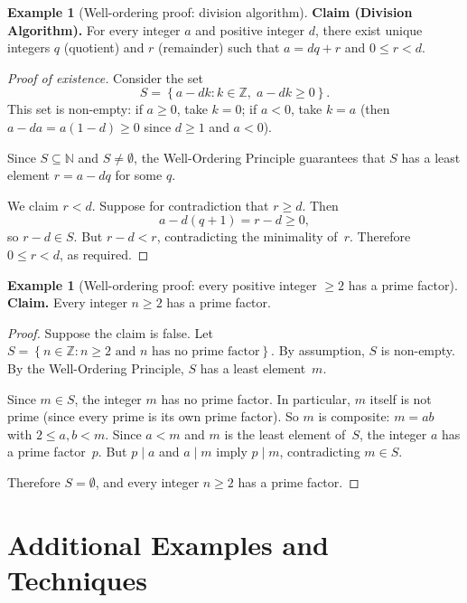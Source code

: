 \documentclass[12pt,a4paper,openany]{book}
\theoremstyle{definition}
\newtheorem{example}[definition]{Example}
\theoremstyle{plain}
\theoremstyle{remark}
\newcommand{\N}{\mathbb{N}}
\newcommand{\Z}{\mathbb{Z}}
\newcommand{\set}[1]{\left\{#1\right\}}
\begin{document}
\begin{example}[Well-ordering proof: division algorithm]
\label{ex:well-ordering-division}
\textbf{Claim (Division Algorithm).}
For every integer $a$ and positive integer $d$, there exist unique integers $q$
(quotient) and $r$ (remainder) such that $a = dq + r$ and $0 \leq r < d$.

\begin{proof}[Proof of existence]
Consider the set
\[
  S = \set{a - dk : k \in \Z,\; a - dk \geq 0}.
\]
This set is non-empty: if $a \geq 0$, take $k = 0$; if $a < 0$, take $k = a$
(then $a - da = a(1 - d) \geq 0$ since $d \geq 1$ and $a < 0$).

Since $S \subseteq \N$ and $S \neq \emptyset$, the Well-Ordering Principle
guarantees that $S$ has a least element $r = a - dq$ for some $q$.

We claim $r < d$. Suppose for contradiction that $r \geq d$. Then
\[
  a - d(q + 1) = r - d \geq 0,
\]
so $r - d \in S$. But $r - d < r$, contradicting the minimality of~$r$.
Therefore $0 \leq r < d$, as required.
\end{proof}
\end{example}

\begin{example}[Well-ordering proof: every positive integer $\geq 2$ has a prime factor]
\label{ex:well-ordering-prime-factor}
\textbf{Claim.} Every integer $n \geq 2$ has a prime factor.

\begin{proof}
Suppose the claim is false. Let $S = \set{n \in \Z : n \geq 2 \text{ and $n$ has no prime factor}}$.
By assumption, $S$ is non-empty. By the Well-Ordering Principle, $S$ has a least
element~$m$.

Since $m \in S$, the integer $m$ has no prime factor. In particular, $m$ itself is
not prime (since every prime is its own prime factor). So $m$ is composite:
$m = ab$ with $2 \leq a, b < m$. Since $a < m$ and $m$ is the least element of~$S$,
the integer $a$ has a prime factor~$p$. But $p \mid a$ and $a \mid m$ imply
$p \mid m$, contradicting $m \in S$.

Therefore $S = \emptyset$, and every integer $n \geq 2$ has a prime factor.
\end{proof}
\end{example}

\section{Additional Examples and Techniques}
\label{sec:additional-proof-examples}
\end{document}
